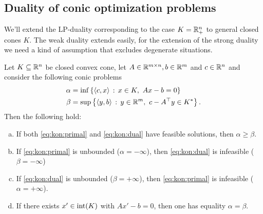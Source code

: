 \subsection{Duality of conic optimization problems}
\label{subsec:konische:Dualitaet}

We'll extend the LP-duality corresponding to the case $K=\mathbb{R}_+^n$ to general closed cones $K$. The weak duality extends easily, for the extension of the strong duality we need a kind of assumption that excludes degenerate situations. 

\begin{theorem}
	\label{thm:kon:dualitaet}
	Let $K \subseteq \mathbb{R}^n$ be closed convex cone, let $A \in \mathbb{R}^{m \times n}, b \in \mathbb{R}^m$ and $c \in \mathbb{R}^n$ and consider the following conic problems
	\begin{align}
		\alpha & = \inf \left\{ \left\langle c , x \right\rangle \,:\, x \in K, \ Ax -b = 0  \right\} \label{eq:kon:primal}
		\\ \beta & = \sup \left\{ \left\langle y , b \right\rangle \,:\, y  \in \mathbb{R}^m, \  c - A^\top y \in K^\ast \right\}. \label{eq:kon:dual}
	\end{align}
	Then the following hold:
	\begin{enumerate}[(a)]
		\item If both \eqref{eq:kon:primal} and \eqref{eq:kon:dual} have feasible solutions, then $\alpha \ge \beta$. 
		\item If \eqref{eq:kon:primal} is unbounded ($\alpha= -\infty$), then \eqref{eq:kon:dual} is infeasible ($\beta = -\infty$)
		\item If \eqref{eq:kon:dual} is unbounded ($\beta=+\infty$), then \eqref{eq:kon:primal} is infeasible ($\alpha = +\infty$). 
		\item If there exists $x' \in \operatorname{int}(K)$ with $A x' - b = 0$, then one has equality $\alpha = \beta$.
	\end{enumerate}
\end{theorem}
